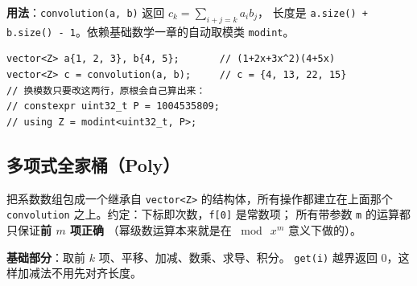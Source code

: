 		\textbf{用法}：\texttt{convolution(a, b)} 返回 $c_k = \sum_{i+j=k} a_i b_j$，
		长度是 \texttt{a.size() + b.size() - 1}。依赖基础数学一章的自动取模类 \texttt{modint}。

		\begin{verbatim}
vector<Z> a{1, 2, 3}, b{4, 5};       // (1+2x+3x^2)(4+5x)
vector<Z> c = convolution(a, b);     // c = {4, 13, 22, 15}
// 换模数只要改这两行，原根会自己算出来：
// constexpr uint32_t P = 1004535809;
// using Z = modint<uint32_t, P>;
		\end{verbatim}

		\subsection{多项式全家桶（Poly）}

		把系数数组包成一个继承自 \texttt{vector<Z>} 的结构体，所有操作都建立在上面那个
		\texttt{convolution} 之上。约定：下标即次数，\texttt{f[0]} 是常数项；
		所有带参数 \texttt{m} 的运算都只保证\textbf{前 $m$ 项正确}
		（幂级数运算本来就是在 $\bmod\ x^m$ 意义下做的）。

		\textbf{基础部分}：取前 $k$ 项、平移、加减、数乘、求导、积分。
		\texttt{get(i)} 越界返回 $0$，这样加减法不用先对齐长度。

